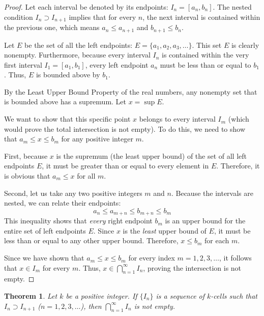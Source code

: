 \documentclass{article}
\theoremstyle{mythm}
\newtheorem{theorem}{Theorem}[section]
\begin{document}
\begin{proof}
Let each interval be denoted by its endpoints: $I_n = [a_n, b_n]$. The nested condition $I_n \supset I_{n+1}$ implies that for every $n$, the next interval is contained within the previous one, which means $a_n \le a_{n+1}$ and $b_{n+1} \le b_n$.

Let $E$ be the set of all the left endpoints: $E = \{a_1, a_2, a_3, \dots\}$. 
This set $E$ is clearly nonempty. Furthermore, because every interval $I_n$ is contained within the very first interval $I_1 = [a_1, b_1]$, every left endpoint $a_n$ must be less than or equal to $b_1$. Thus, $E$ is bounded above by $b_1$.

By the Least Upper Bound Property of the real numbers, any nonempty set that is bounded above has a supremum. Let $x = \sup E$. 

We want to show that this specific point $x$ belongs to every interval $I_m$ (which would prove the total intersection is not empty). To do this, we need to show that $a_m \le x \le b_m$ for any positive integer $m$.

First, because $x$ is the supremum (the least upper bound) of the set of all left endpoints $E$, it must be greater than or equal to every element in $E$. Therefore, it is obvious that $a_m \le x$ for all $m$.

Second, let us take any two positive integers $m$ and $n$. Because the intervals are nested, we can relate their endpoints:
\[ a_n \le a_{m+n} \le b_{m+n} \le b_m \]
This inequality shows that \textit{every} right endpoint $b_m$ is an upper bound for the entire set of left endpoints $E$. 
Since $x$ is the \textit{least} upper bound of $E$, it must be less than or equal to any other upper bound. Therefore, $x \le b_m$ for each $m$.

Since we have shown that $a_m \le x \le b_m$ for every index $m = 1, 2, 3, \dots$, it follows that $x \in I_m$ for every $m$. Thus, $x \in \bigcap_{n=1}^\infty I_n$, proving the intersection is not empty.
\end{proof}
\begin{theorem}
Let $k$ be a positive integer. If $\{I_n\}$ is a sequence of $k$-cells such that $I_n \supset I_{n+1}$ ($n = 1, 2, 3, \dots$), then $\bigcap_{n=1}^\infty I_n$ is not empty.
\end{theorem}
\end{document}
